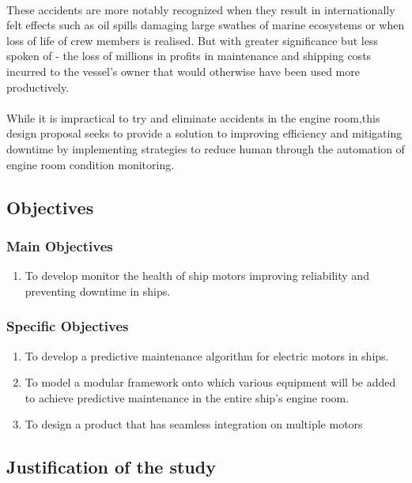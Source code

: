 \paragraph{}These accidents are more notably recognized when they result in internationally felt effects such as oil spills damaging large swathes of marine ecosystems or when loss of life of crew members is realised. But with greater significance but less spoken of - the loss of millions in profits in maintenance and shipping costs incurred to the vessel's owner that would otherwise have been used more productively.

\paragraph{}While it is impractical to try and eliminate accidents in the engine room,this design proposal seeks to provide a solution to improving efficiency and mitigating downtime by implementing strategies to reduce human through the automation of engine room condition monitoring\cite{stefanopoulou_mechatronics_nodate}.
\subsection{Objectives}
\subsubsection{Main Objectives}
\begin{enumerate}
\item To develop monitor the health of ship motors improving reliability and preventing downtime in ships.

\end{enumerate}
\subsubsection{Specific Objectives}
\begin{enumerate}
\item To develop a predictive maintenance algorithm for electric motors in ships.
\item To model a modular framework onto which various equipment will be added to achieve predictive maintenance in the entire ship's engine room. 
\item To design a product that has seamless integration on multiple motors
\end{enumerate}
\subsection{Justification of the study}
